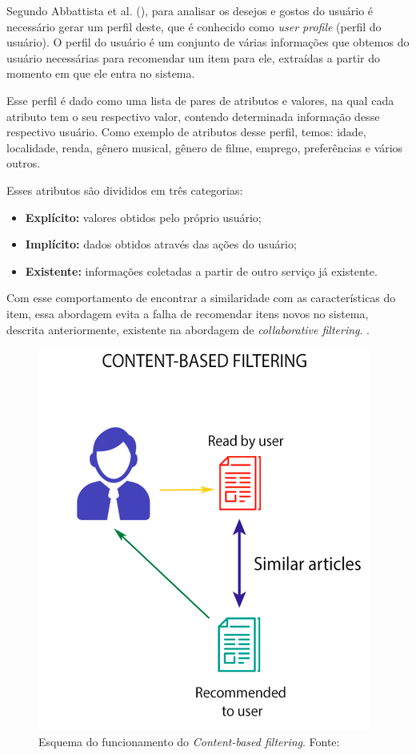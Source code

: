 Segundo Abbattista et al. (\citeyear{Abbattista:2002}), para analisar os desejos e gostos do usuário é necessário gerar um perfil deste, que é conhecido como \textit{user profile} (perfil do usuário). O perfil do usuário é um conjunto de várias informações que obtemos do usuário necessárias para recomendar um item para ele, extraídas a partir do momento em que ele entra no sistema.

Esse perfil é dado como uma lista de pares de atributos e valores, na qual cada atributo tem o seu respectivo valor, contendo determinada informação desse respectivo usuário. Como exemplo de atributos desse perfil, temos: idade, localidade, renda, gênero musical, gênero de filme, emprego, preferências e vários outros.

Esses atributos são divididos em três categorias:
\begin{itemize}
    \item \textbf{Explícito:} valores obtidos pelo próprio usuário;

    \item \textbf{Implícito:} dados obtidos através das ações do usuário;

    \item \textbf{Existente:} informações coletadas a partir de outro serviço já existente.
\end{itemize}

Com esse comportamento de encontrar a similaridade com as características do item, essa abordagem evita a falha de recomendar itens novos no sistema, descrita anteriormente, existente na abordagem de \textit{collaborative filtering}. \cite{Luk:2019}.

\begin{figure}[H]
    \centering
    \includegraphics[scale=0.6]{figuras/referencial_teorico/content_based.png}
    \caption[Esquema do funcionamento do Content-based filtering]{Esquema do funcionamento do \textit{Content-based filtering}. Fonte: \cite{Jain:2019}}
    \label{fig:content_based}
\end{figure}


